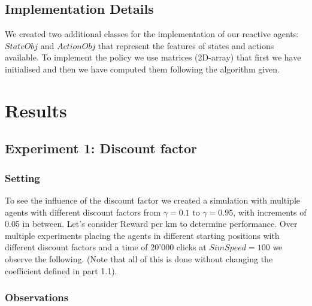 \documentclass[11pt]{article}
\begin{document}
\subsection{Implementation Details}

\indent \indent We created two additional classes for the implementation of our reactive agents: $StateObj$ and $ActionObj$ that represent the features of states and actions available. To implement the policy we use matrices (2D-array) that first we have initialised and then we have computed them following the algorithm given.

\section{Results}

\subsection{Experiment 1: Discount factor}

\subsubsection{Setting}

\indent \indent To see the influence of the discount factor we created a simulation with multiple agents with different discount factors from $\gamma=0.1$ to $\gamma=0.95$, with increments of 0.05 in between. Let's consider Reward per km to determine performance. Over multiple experiments placing the agents in different starting positions with different discount factors and a time of 20'000 clicks at $SimSpeed = 100$ we observe the following. (Note that all of this is done without changing the coefficient defined in part 1.1).

\subsubsection{Observations}
\end{document}
